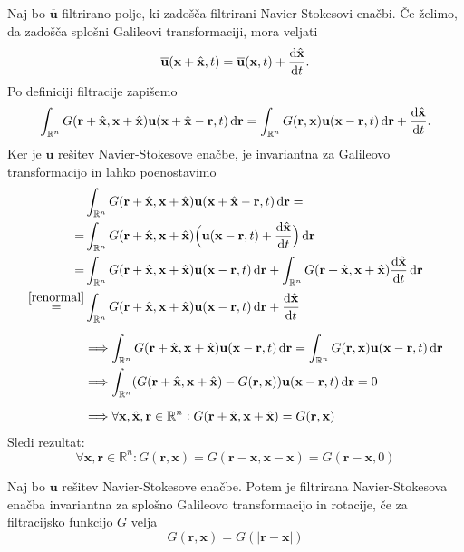 \documentclass[mat2, tisk]{fmfdelo}
\newcommand{\R}{\mathbb R}
\newcommand{\bd}{\textbf}
\begin{document}
\begin{dokaz}
   Naj bo $\overline{\bd{u}}$ filtrirano polje, ki zadošča filtrirani Navier-Stokesovi enačbi.
  Če želimo, da zadošča splošni Galileovi transformaciji, mora veljati 
  $$
  \overline{\bd{u}}(\bd{x} + \hat{\bd{x}}, t) = \overline{\bd{u}}(\bd{x}, t) + \frac{\dif \hat{\bd{x}}}{\dif t}.
  $$
  Po definiciji filtracije zapišemo
  \begin{align*}
  \int_{\R^n} G(\bd{r} + \hat{\bd{x}}, \bd{x} + \hat{\bd{x}}) \bd{u}(\bd{x} + \hat{\bd{x}} - \bd{r}, t) \dif \bd{r} = \int_{\R^n} G(\bd{r}, \bd{x}) \bd{u}(\bd{x} - \bd{r}, t)\dif \bd{r} + \frac{\dif \hat{\bd{x}}}{\dif t} .
  \end{align*}
  Ker je $\bd{u}$ rešitev Navier-Stokesove enačbe, je invariantna za Galileovo transformacijo in lahko poenostavimo 
  \begin{align*}
    &\int_{\R^n} G(\bd{r} + \hat{\bd{x}}, \bd{x} + \hat{\bd{x}}) \bd{u}(\bd{x} + \hat{\bd{x}} - \bd{r}, t) \dif \bd{r} = \\
    =& \int_{\R^n} G(\bd{r} + \hat{\bd{x}}, \bd{x} + \hat{\bd{x}}) \Big(\bd{u}(\bd{x} - \bd{r}, t) + \frac{\dif \hat{\bd{x}}}{\dif t} \Big)\dif \bd{r} \\
    =& \int_{\R^n} G(\bd{r} + \hat{\bd{x}}, \bd{x} + \hat{\bd{x}}) \bd{u}(\bd{x} - \bd{r}, t)\dif \bd{r}  + \int_{\R^n} G(\bd{r} + \hat{\bd{x}}, \bd{x} + \hat{\bd{x}}) \frac{\dif \hat{\bd{x}}}{\dif t} \dif \bd{r}\\
    \stackrel{\ref{renormal}}{=}& \int_{\R^n} G(\bd{r} + \hat{\bd{x}}, \bd{x} + \hat{\bd{x}}) \bd{u}(\bd{x} - \bd{r}, t)\dif \bd{r}  + \frac{\dif \hat{\bd{x}}}{\dif t}\\[2mm]
    &\Longrightarrow \int_{\R^n} G(\bd{r} + \hat{\bd{x}}, \bd{x} + \hat{\bd{x}}) \bd{u}(\bd{x} - \bd{r}, t)\dif \bd{r} = \int_{\R^n} G(\bd{r}, \bd{x}) \bd{u}(\bd{x} - \bd{r}, t)\dif \bd{r}\\
    &\Longrightarrow  \int_{\R^n} (G(\bd{r} + \hat{\bd{x}}, \bd{x} + \hat{\bd{x}}) - G(\bd{r}, \bd{x})) \bd{u}(\bd{x} - \bd{r}, t)\dif \bd{r} = 0\\[2mm]
    &\Longrightarrow \forall \bd{x}, \hat{\bd{x}}, \bd{r} \in \R^n: G(\bd{r} + \hat{\bd{x}}, \bd{x} + \hat{\bd{x}}) = G(\bd{r}, \bd{x})
  \end{align*}
  Sledi rezultat: 
  $$
  \forall \bd{x}, \bd{r} \in \R^n: G(\bd{r}, \bd{x}) = G(\bd{r} - \bd{x}, \bd{x} - \bd{x}) = G(\bd{r} - \bd{x}, 0)
  $$
\end{dokaz}

\begin{lema}
  Naj bo $\bd{u}$ rešitev Navier-Stokesove enačbe. Potem je filtrirana Navier-Stokesova enačba 
  invariantna za splošno Galileovo transformacijo in rotacije, če za filtracijsko funkcijo $G$ velja 
  $$
  G(\bd{r}, \bd{x}) = G(|\bd{r} - \bd{x}|)
  $$
\end{lema}
\end{document}
